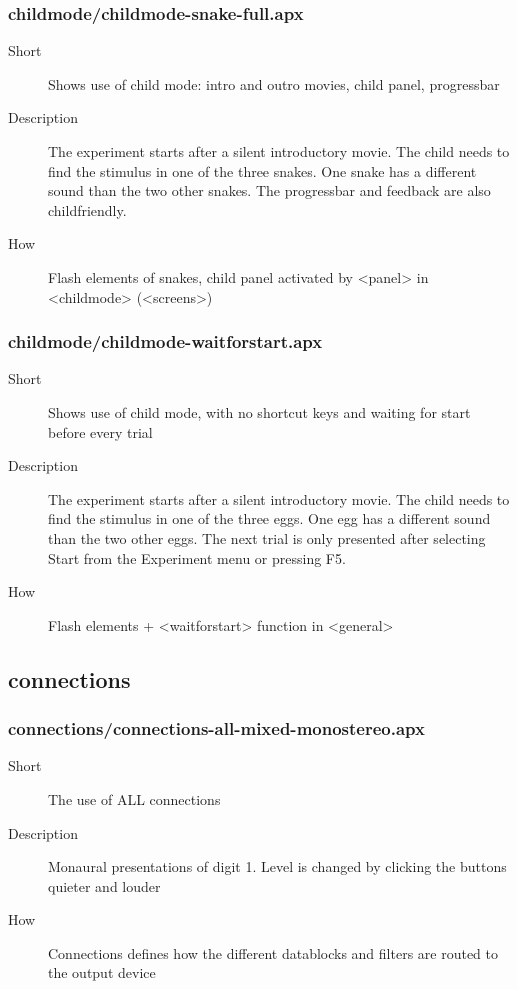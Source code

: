 \subsubsection{childmode/childmode-snake-full.apx}
\begin{description}
\item[Short] 
 Shows use of child mode: intro and outro movies, child panel, progressbar
\item[Description] 
 The experiment starts after a silent introductory movie. The child needs to find the stimulus in one of the three snakes. One snake has a different sound than the two other snakes. The progressbar and feedback are also childfriendly.
\item[How] 
 Flash elements of snakes, child panel activated by \textless{}panel\textgreater{} in \textless{}childmode\textgreater{} (\textless{}screens\textgreater{})
\end{description}

\subsubsection{childmode/childmode-waitforstart.apx}
\begin{description}
\item[Short] 
 Shows use of child mode, with no shortcut keys and waiting for start before every trial
\item[Description] 
 The experiment starts after a silent introductory movie. The child needs to find the stimulus in one of the three eggs. One egg has a different sound than the two other eggs. The next trial is only presented after selecting Start from the Experiment menu or pressing F5.
\item[How] 
 Flash elements + \textless{}waitforstart\textgreater{} function in \textless{}general\textgreater{}
\end{description}

\subsection{connections}
\subsubsection{connections/connections-all-mixed-monostereo.apx}
\begin{description}
\item[Short] 
 The use of ALL connections
\item[Description] 
 Monaural presentations of digit 1. Level is changed by clicking the buttons quieter and louder
\item[How] 
 Connections defines how the different datablocks and filters are routed to the output device
\end{description}

